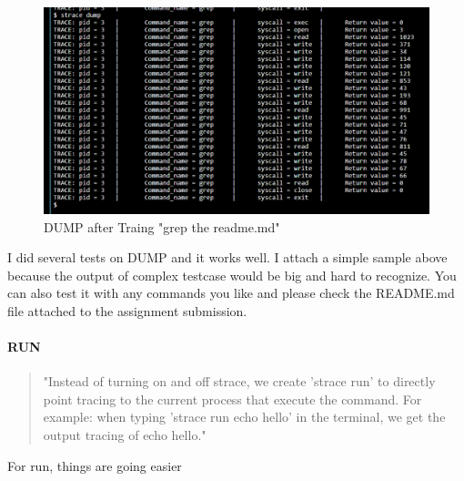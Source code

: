 \documentclass[11pt,oneside,a4paper]{article}
\begin{document}
\begin{figure}[H]
    \includegraphics[width=4.75in]{1-12.png}
    \centering
    \caption{DUMP after Traing "grep the readme.md"}
\end{figure}

I did several tests on DUMP and it works well. I attach a simple sample above because 
the output of complex testcase would be big and hard to recognize. 
You can also test it with any commands you like and please check the README.md file 
attached to the assignment submission.

\paragraph*{RUN}

\begin{quotation}
    "Instead of turning on and off strace, we create 'strace run' to directly point tracing to the current
process that execute the command. For example: when typing 'strace run echo hello' in the
terminal, we get the output tracing of echo hello."
\end{quotation}

For run, things are going easier
\end{document}
